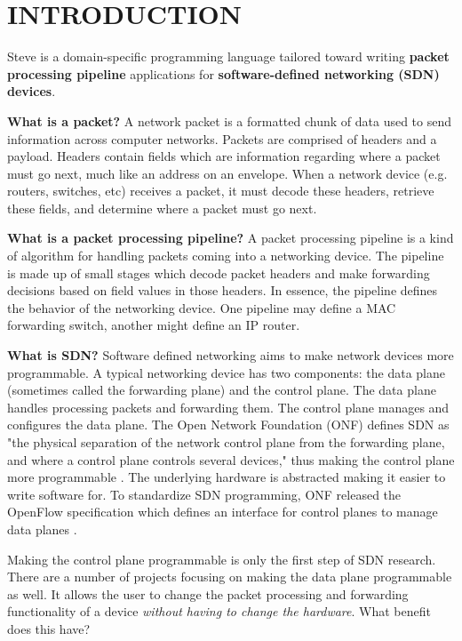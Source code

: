 \chapter{INTRODUCTION} \label{ch:intro}

Steve is a domain-specific programming language tailored toward writing \textbf{packet processing pipeline} applications for \textbf{software-defined networking (SDN) devices}. 

\textbf{What is a packet?} A network packet is a formatted chunk of data used to send information across computer networks. Packets are comprised of headers and a payload. Headers contain fields which are information regarding where a packet must go next, much like an address on an envelope. When a network device (e.g. routers, switches, etc) receives a packet, it must decode these headers, retrieve these fields, and determine where a packet must go next.

\textbf{What is a packet processing pipeline?} A packet processing pipeline is a kind of algorithm for handling packets coming into a networking device. The pipeline is made up of small stages which decode packet headers and make forwarding decisions based on field values in those headers. In essence, the pipeline defines the behavior of the networking device. One pipeline may define a MAC forwarding switch, another might define an IP router.

\textbf{What is SDN?} Software defined networking aims to make network devices more programmable. A typical networking device has two components: the data plane (sometimes called the forwarding plane) and the control plane. The data plane handles processing packets and forwarding them. The control plane manages and configures the data plane. The Open Network Foundation (ONF) defines SDN as "the physical separation of the network control plane from the forwarding plane, and where a control plane controls several devices," thus making the control plane more programmable \cite{onf_sdn_def}. The underlying hardware is abstracted making it easier to write software for. To standardize SDN programming, ONF released the OpenFlow specification which defines an interface for control planes to manage data planes \cite{openflow_spec}.

Making the control plane programmable is only the first step of SDN research. There are a number of projects focusing on making the data plane programmable as well. It allows the user to change the packet processing and forwarding functionality of a device \textit{without having to change the hardware}. What benefit does this have?

